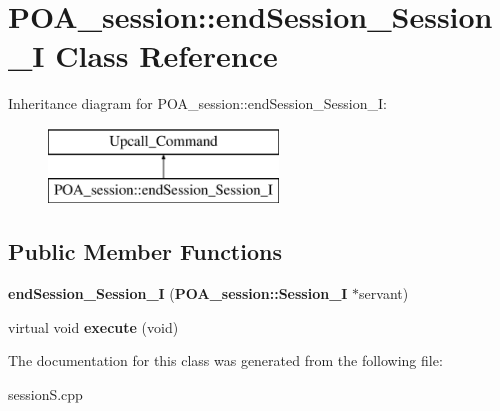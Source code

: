 \section{P\+O\+A\+\_\+session\+:\+:end\+Session\+\_\+\+Session\+\_\+I Class Reference}
\label{classPOA__session_1_1endSession__Session__I}
Inheritance diagram for P\+O\+A\+\_\+session\+:\+:end\+Session\+\_\+\+Session\+\_\+I\+:\begin{figure}[H]
\begin{center}
\leavevmode
\includegraphics[height=2.000000cm]{classPOA__session_1_1endSession__Session__I}
\end{center}
\end{figure}
\subsection*{Public Member Functions}
\begin{DoxyCompactItemize}
\item 
{\bfseries end\+Session\+\_\+\+Session\+\_\+I} ({\bf P\+O\+A\+\_\+session\+::\+Session\+\_\+I} $\ast$servant)\label{classPOA__session_1_1endSession__Session__I_a39cf1a1ac42790ae2d4b0036ffa17ee6}

\item 
virtual void {\bfseries execute} (void)\label{classPOA__session_1_1endSession__Session__I_a03fb61266a4c801f9152eee5864cea06}

\end{DoxyCompactItemize}


The documentation for this class was generated from the following file\+:\begin{DoxyCompactItemize}
\item 
session\+S.\+cpp\end{DoxyCompactItemize}
